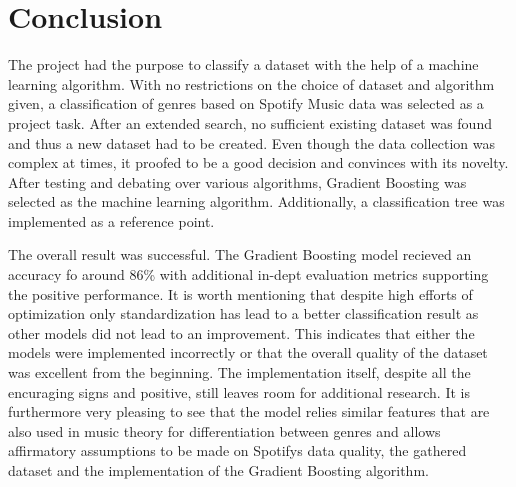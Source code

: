 \section{Conclusion}

    The project had the purpose to classify a dataset with the help of a machine learning algorithm. With no restrictions on the choice of dataset and algorithm given, 
    a classification of genres based on Spotify Music data was selected as a project task. After an extended search, 
    no sufficient existing dataset was found and thus a new dataset had to be created. Even though the data collection was complex at times, 
    it proofed to be a good decision and convinces with its novelty. After testing and debating over various algorithms, Gradient Boosting was
    selected as the machine learning algorithm. Additionally, a classification tree was implemented as a reference point.


    The overall result was successful. The Gradient Boosting model recieved an accuracy fo around 86\% with additional in-dept evaluation metrics supporting the
    positive performance. It is worth mentioning that despite high efforts of optimization only standardization has lead to a better classification result as other models 
    did not lead to an improvement. This indicates that either the models were implemented incorrectly or that the overall quality of the dataset was excellent from the 
    beginning. The implementation itself, despite all the encuraging signs and positive, still leaves room for additional research. It is furthermore very pleasing to see that the model relies 
    similar features that are also used in music theory for differentiation between genres and allows affirmatory assumptions to be made on Spotifys data quality, the gathered dataset 
    and the implementation of the Gradient Boosting algorithm. 

